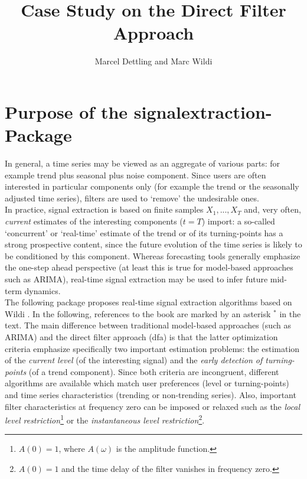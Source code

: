 \documentclass[a4paper]{article}
\title{Case Study on the Direct Filter Approach}
\author{Marcel Dettling and Marc Wildi}
\begin{document}
\maketitle

\section{Purpose of the signalextraction-Package}

In general, a time series may be viewed as an aggregate of various
parts: for example trend plus seasonal plus noise component. Since
users are often interested in particular components only (for example
the trend or the seasonally adjusted time series), filters are used to
`remove' the undesirable ones. \\

In practice, signal extraction is based on finite samples
$X_1,...,X_T$ and, very often, \emph{current} estimates of the
interesting components ($t=T$) import: a so-called `concurrent' or
`real-time' estimate of the trend or of its turning-points has a
strong prospective content, since the future evolution of the time
series is likely to be conditioned by this component. Whereas
forecasting tools generally emphasize the one-step ahead perspective
(at least this is true for model-based approaches such as ARIMA),
real-time signal extraction may be used to infer future mid-term
dynamics. \\

The following package proposes real-time signal extraction algorithms
based on Wildi \cite{wildi2007}. In the following, references to the
book are marked by an asterisk $^*$ in the text. The main difference
between traditional model-based approaches (such as ARIMA) and the
direct filter approach (dfa) is that the latter optimization criteria
emphasize specifically two important estimation problems: the
estimation of the \emph{current level} (of the interesting signal) and
the \emph{early detection of turning-points} (of a trend component). 
Since both criteria are incongruent, different algorithms are
available which match user preferences (level or turning-points) and
time series characteristics (trending or non-trending series). Also,
important filter characteristics at frequency zero can be imposed or
relaxed such as the \emph{local level
  restriction}\footnote{\label{foot1}$A(0)=1$, where $A(\omega)$ is
  the amplitude function.} or the \emph{instantaneous level
  restriction}\footnote{$A(0)=1$ and the time delay of the filter
  vanishes in frequency zero.}. \\
\end{document}
